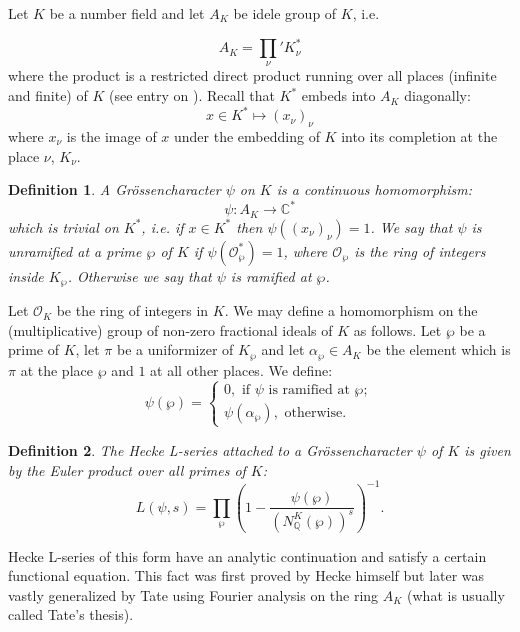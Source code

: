 \documentclass[12pt]{article}
\newtheorem{defn}{Definition}
\theoremstyle{definition}
\newcommand{\Complex}{\mathbb{C}}
\newcommand{\Rats}{\mathbb{Q}}
\begin{document}
Let $K$ be a number field and let $A_K$ be idele group of $K$, i.e.

$$A_K={\prod_\nu}' K_\nu^\ast$$
where the product is a restricted direct product running over all places (infinite and finite) of $K$ (see entry on ). Recall that $K^\ast$ embeds into $A_K$ diagonally:
$$x\in K^\ast \mapsto (x_\nu)_\nu$$
where $x_\nu$ is the image of $x$ under the embedding of $K$ into its completion at the place $\nu$, $K_\nu$.

\begin{defn}
A Gr\"ossencharacter $\psi$ on $K$ is a continuous homomorphism:
$$\psi:A_K \longrightarrow \Complex^\ast$$
which is trivial on $K^\ast$, i.e. if $x\in K^\ast$ then $\psi((x_\nu)_\nu)=1$. We say that $\psi$ is unramified at a prime $\wp$ of $K$ if $\psi(\mathcal{O}_\wp^\ast)=1$, where $\mathcal{O}_\wp$ is the ring of integers inside $K_\wp$. Otherwise we say that $\psi$ is ramified at $\wp$.
\end{defn}

Let $\mathcal{O}_K$ be the ring of integers in $K$. We may define a homomorphism on the (multiplicative) group of non-zero fractional ideals of $K$ as follows. Let $\wp$ be a prime of $K$, let $\pi$ be a uniformizer of $K_\wp$ and let $\alpha_\wp\in A_K$ be the element which is $\pi$ at the place $\wp$ and $1$ at all other places. We define:
$$\psi(\wp)=\begin{cases}
0, \text{ if } \psi \text{ is ramified at }\wp;\\
\psi(\alpha_\wp), \text{ otherwise}.
\end{cases}$$

\begin{defn}
The Hecke L-series attached to a Gr\"ossencharacter $\psi$ of $K$ is given by the Euler product over all primes of $K$:
$$L(\psi,s)=\prod_\wp\left(1-\frac{\psi(\wp)}{(N_{\Rats}^K(\wp))^s}\right)^{-1}.$$
\end{defn}

Hecke L-series of this form have an analytic continuation and satisfy a certain functional equation. This fact was first proved by Hecke himself but later was vastly generalized by Tate using Fourier analysis on the ring $A_K$ (what is usually called Tate's thesis).
\end{document}
